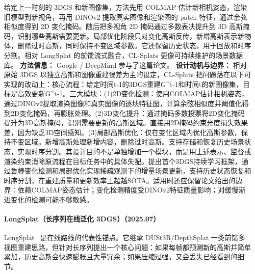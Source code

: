 给定上一时刻的 3DGS 和新图像集，方法先用 COLMAP 估计新相机姿态，渲染旧模型到新视角，再用 DINOv2 提取真实图像和渲染图的 patch 特征，通过余弦相似度得到 2D 变化掩码。随后把多视角 2D 掩码通过多数表决提升到 3D 高斯掩码，识别哪些高斯需要更新。局部优化阶段只对变化高斯反传，新增高斯表示新物体，删除过时高斯，同时保持不变区域参数。它还保留历史状态，用于回放和时序分割。相对 LongSplat 的前馈流式融合，CL-Splats 更像可持续维护的场景数据库。
\textbf{方法信息：} Google / DeepMind 参与了这篇论文。
\textbf{设计动机与边界：} 相对原始 3DGS 以独立高斯和图像重建误差为主的设定，CL-Splats 把问题落在以下可实现的改动上：核心流程：给定时间t-1的3DGS重建G\^{}t-1和时间t的新图像集，目标是高效更新G\^{}t-1。三大模块：(1)2D变化检测：使用COLMAP估计相机姿态，通过DINOv2提取渲染图像和真实图像的逐块特征图，计算余弦相似度并阈值化得到2D变化掩码，再膨胀处理。(2)3D变化提升：通过掩码多数投票将2D变化掩码提升为3D高斯掩码，识别需要更新的高斯区域。直接用2D掩码约束光度损失效果差，因为缺乏3D空间感知。(3)局部高斯优化：仅在变化区域内优化高斯参数，保持不变区域。新增高斯处理新增内容，删除过时高斯。支持存储和恢复历史场景状态，实现时序分割。其设计目的不是单独增加一个模块，而是用上述表示、监督或渲染约束消除原流程在目标任务中的具体失配。提出首个3DGS持续学习框架，通过鲁棒变化检测和局部优化实现稀疏观测下的增量场景更新，支持历史状态恢复和时序分割，在重建质量和更新效率上超越SOTA。适用时还应保留论文给出的边界：依赖COLMAP姿态估计；变化检测精度受DINOv2特征质量影响；对缓慢渐进变化的检测可能不够敏感。
\paragraph{LongSplat（长序列在线泛化 3DGS）（2025.07）}
LongSplat~\cite{2507_16144} 是在线路线的代表性锚点。它继承 DUSt3R/DepthSplat 一类前馈多视图重建思路，但针对长序列提出一个核心问题：如果每帧都预测新的高斯并简单累加，历史高斯会快速膨胀且大量冗余；如果压缩过强，又会丢失已经看到的细节。


